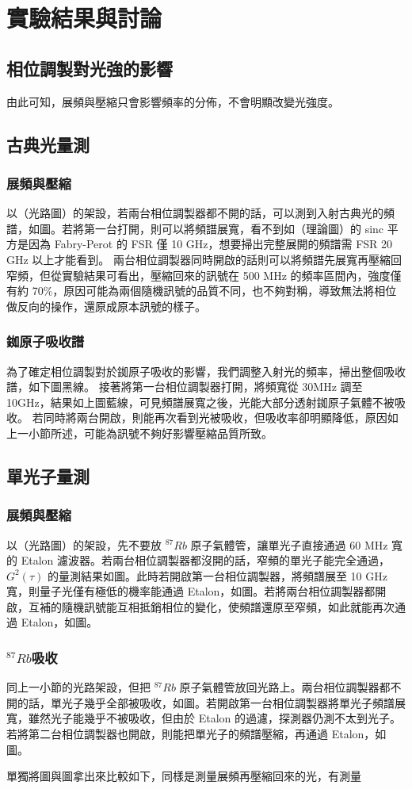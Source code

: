 \documentclass[class=NCU_thesis, crop=false]{standalone}
\begin{document}
\chapter{實驗結果與討論}

\section{相位調製對光強的影響}
由此可知，展頻與壓縮只會影響頻率的分佈，不會明顯改變光強度。

\section{古典光量測}
\subsection{展頻與壓縮}
以（光路圖）的架設，若兩台相位調製器都不開的話，可以測到入射古典光的頻譜，如圖。若將第一台打開，則可以將頻譜展寬，看不到如（理論圖）的 sinc 平方是因為 Fabry-Perot 的 FSR 僅 10 GHz，想要掃出完整展開的頻譜需 FSR 20 GHz 以上才能看到。
兩台相位調製器同時開啟的話則可以將頻譜先展寬再壓縮回窄頻，但從實驗結果可看出，壓縮回來的訊號在 500 MHz 的頻率區間內，強度僅有約 70\%，原因可能為兩個隨機訊號的品質不同，也不夠對稱，導致無法將相位做反向的操作，還原成原本訊號的樣子。

\subsection{銣原子吸收譜}
為了確定相位調製對於銣原子吸收的影響，我們調整入射光的頻率，掃出整個吸收譜，如下圖黑線。
接著將第一台相位調製器打開，將頻寬從 30MHz 調至 10GHz，結果如上圖藍線，可見頻譜展寬之後，光能大部分透射銣原子氣體不被吸收。
若同時將兩台開啟，則能再次看到光被吸收，但吸收率卻明顯降低，原因如上一小節所述，可能為訊號不夠好影響壓縮品質所致。

\section{單光子量測}
\subsection{展頻與壓縮}
以（光路圖）的架設，先不要放 $^{87}Rb$ 原子氣體管，讓單光子直接通過 60 MHz 寬的 Etalon 濾波器。若兩台相位調製器都沒開的話，窄頻的單光子能完全通過，$G^{2}(\tau)$ 的量測結果如圖。此時若開啟第一台相位調製器，將頻譜展至 10 GHz 寬，則量子光僅有極低的機率能通過 Etalon，如圖。若將兩台相位調製器都開啟，互補的隨機訊號能互相抵銷相位的變化，使頻譜還原至窄頻，如此就能再次通過 Etalon，如圖。

\subsection{$^{87}Rb$吸收}
同上一小節的光路架設，但把 $^{87}Rb$ 原子氣體管放回光路上。兩台相位調製器都不開的話，單光子幾乎全部被吸收，如圖。若開啟第一台相位調製器將單光子頻譜展寬，雖然光子能幾乎不被吸收，但由於 Etalon 的過濾，探測器仍測不太到光子。若將第二台相位調製器也開啟，則能把單光子的頻譜壓縮，再通過 Etalon，如圖。

單獨將圖與圖拿出來比較如下，同樣是測量展頻再壓縮回來的光，有測量

\centering 
\end{document}
